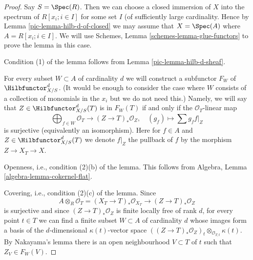 \begin{proof}

Say $S = \Spec(R)$. Then we can choose a closed immersion of $X$
into the spectrum of $R[x_i; i \in I]$ for some set $I$ (of sufficiently
large cardinality. Hence by Lemma \ref{pic-lemma-hilb-d-of-closed}
we may assume that $X = \Spec(A)$ where $A = R[x_i; i \in I]$.
We will use Schemes, Lemma \ref{schemes-lemma-glue-functors} to prove the
lemma in this case.

\medskip\noindent
Condition (1) of the lemma follows from Lemma \ref{pic-lemma-hilb-d-sheaf}.

\medskip\noindent
For every subset $W \subset A$ of cardinality $d$ we will
construct a subfunctor $F_W$ of $\Hilbfunctor^d_{X/S}$.
(It would be enough to consider the case where $W$ consists of a
collection of monomials in the $x_i$ but we do not need this.)
Namely, we will say that $Z \in \Hilbfunctor^d_{X/S}(T)$ is in $F_W(T)$
if and only if the $\mathcal{O}_T$-linear map
$$
\bigoplus\nolimits_{f \in W} \mathcal{O}_T
\longrightarrow
(Z \to T)_*\mathcal{O}_Z,\quad
(g_f) \longmapsto \sum g_f f|_Z
$$
is surjective (equivalently an isomorphism). Here for $f \in A$
and $Z \in \Hilbfunctor^d_{X/S}(T)$ we denote $f|_Z$ the pullback of $f$
by the morphism $Z \to X_T \to X$.

\medskip\noindent
Openness, i.e., condition (2)(b) of the lemma. This follows from
Algebra, Lemma \ref{algebra-lemma-cokernel-flat}.

\medskip\noindent
Covering, i.e., condition (2)(c) of the lemma. Since
$$
A \otimes_R \mathcal{O}_T =
(X_T \to T)_*\mathcal{O}_{X_T} \to (Z \to T)_*\mathcal{O}_Z
$$
is surjective and since $(Z \to T)_*\mathcal{O}_Z$ is finite locally
free of rank $d$, for every point $t \in T$ we can find a finite
subset $W \subset A$ of cardinality $d$ whose images form a basis
of the $d$-dimensional $\kappa(t)$-vector space
$((Z \to T)_*\mathcal{O}_Z)_t \otimes_{\mathcal{O}_{T, t}} \kappa(t)$.
By Nakayama's lemma there is an open neighbourhood $V \subset T$
of $t$ such that $Z_V \in F_W(V)$.


\end{proof}
